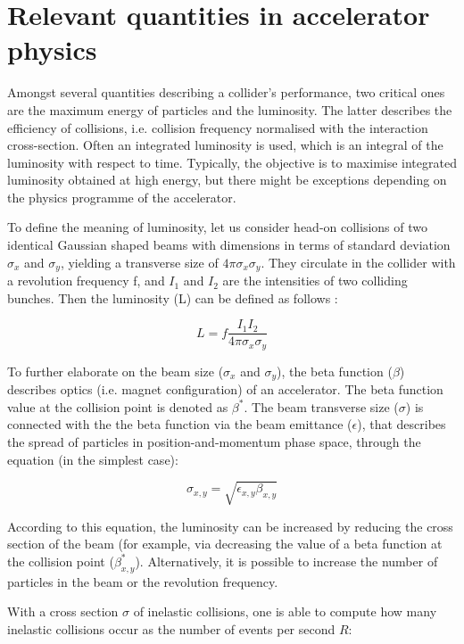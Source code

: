 \documentclass[encoding=utf8,british]{tumphthesis}
\begin{document}
\section{Relevant quantities in accelerator physics}

Amongst several quantities describing a collider's performance, two critical ones are the maximum energy of particles and the luminosity. The latter describes the efficiency of collisions, i.e. collision frequency normalised with the interaction cross-section. Often an integrated luminosity is used, which is an integral of the luminosity with respect to time. Typically, the objective is to maximise integrated luminosity obtained at high energy, but there might be exceptions depending on the physics programme of the accelerator.

To define the meaning of luminosity, let us consider head-on collisions of two identical Gaussian shaped beams with dimensions in terms of standard deviation $\sigma_x$ and $\sigma_y$, yielding a transverse size of $4\pi \sigma_x \sigma_y$. They circulate in the collider with a revolution frequency f, and $I_1$ and $I_2$ are the intensities of two colliding bunches. Then the luminosity (L) can be defined as follows \cite{concept-of-luminosity}:

\begin{equation}
    L = f \frac{I_1 I_2}{4\pi \sigma_x \sigma_y}
\end{equation}

To further elaborate on the beam size ($\sigma_x$ and $\sigma_y$), the beta function ($\beta$) describes optics (i.e. magnet configuration) of an accelerator. The beta function value at the collision point is denoted as $\beta^*$. The beam transverse size ($\sigma$) is connected with the the beta function via the beam emittance ($\epsilon$), that describes the spread of particles in position-and-momentum phase space, through the equation (in the simplest case):

\begin{equation}
    \sigma_{x,y} = \sqrt{\epsilon_{x,y} \beta_{x,y}}
\end{equation}

According to this equation, the luminosity can be increased by reducing the cross section of the beam (for example, via decreasing the value of a beta function at the collision point ($\beta^*_{x,y}$). Alternatively, it is possible to increase the number of particles in the beam or the revolution frequency.

With a cross section $\sigma$ of inelastic collisions, one is able to compute how many inelastic collisions occur as the number of events per second $R$:
\end{document}
